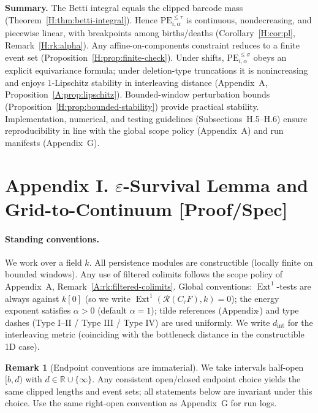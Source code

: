 \documentclass[11pt]{article}
\numberwithin{equation}{section}
\theoremstyle{plain}
\theoremstyle{definition}
\theoremstyle{remark}
\DeclareMathOperator{\Ext}{Ext}
\theoremstyle{plain}
\theoremstyle{definition}
\numberwithin{equation}{section}
\theoremstyle{definition}
\newtheorem{remark}[theorem]{Remark}
\numberwithin{equation}{section}
\theoremstyle{plain}
\theoremstyle{definition}
\theoremstyle{remark}
\begin{document}
\medskip
\noindent\textbf{Summary.}
The Betti integral equals the clipped barcode mass (Theorem~\ref{H:thm:betti-integral}). Hence $\mathrm{PE}_{i,\alpha}^{\le \tau}$ is continuous, nondecreasing, and piecewise linear, with breakpoints among births/deaths (Corollary~\ref{H:cor:pl}, Remark~\ref{H:rk:alpha}). Any affine-on-components constraint reduces to a finite event set (Proposition~\ref{H:prop:finite-check}). Under shifts, $\mathrm{PE}_{i,\alpha}^{\le \sigma}$ obeys an explicit equivariance formula; under deletion-type truncations it is nonincreasing and enjoys $1$-Lipschitz stability in interleaving distance (Appendix~A, Proposition~\ref{A:prop:lipschitz}). Bounded-window perturbation bounds (Proposition~\ref{H:prop:bounded-stability}) provide practical stability. Implementation, numerical, and testing guidelines (Subsections~H.5--H.6) ensure reproducibility in line with the global scope policy (Appendix~A) and run manifests (Appendix~G).



\section*{Appendix I. \texorpdfstring{$\varepsilon$}{epsilon}-Survival Lemma and Grid-to-Continuum [Proof/Spec]}
{}
\label{I:eps-survival}

\paragraph{Standing conventions.}
We work over a field \(k\). All persistence modules are constructible (locally finite on bounded windows). Any use of filtered colimits follows the scope policy of Appendix~A, Remark~\ref{A:rk:filtered-colimits}. Global conventions: \(\Ext^1\)-tests are always against \(k[0]\) (so we write \(\Ext^1(\mathcal{R}(C_\tau F),k)=0\)); the energy exponent satisfies \(\alpha>0\) (default \(\alpha=1\)); tilde references (\(\text{Appendix}\,\tilde{}\)) and type dashes (Type I--II / Type III / Type IV) are used uniformly. We write \(d_{\mathrm{int}}\) for the interleaving metric (coinciding with the bottleneck distance in the constructible 1D case).

\begin{remark}[Endpoint conventions are immaterial]\label{I:rk:endpoints}
We take intervals half-open \([b,d)\) with \(d\in\mathbb{R}\cup\{\infty\}\). Any consistent open/closed endpoint choice yields the same clipped lengths and event sets; all statements below are invariant under this choice. Use the same right-open convention as Appendix~G for run logs.
\end{remark}
\end{document}

